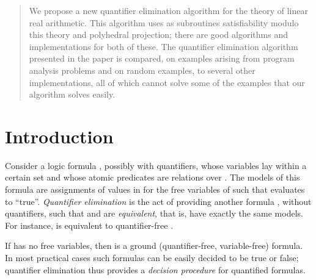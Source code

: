 \newcommand{\bbQ}{\mathbb{Q}}
\newcommand{\bbR}{\mathbb{R}}
\newcommand{\parts}[1]{\mathcal{P}(#1)}
\newcommand{\sem}[1]{\llbracket #1 \rrbracket}

\newcommand{\eabs}{\epsilon_{\text{abs}}}
\newcommand{\erel}{\epsilon_{\text{rel}}}

\newcommand{\lfp}{\text{lfp~}}

\newcommand{\abstr}[1]{#1^\sharp}

\newcommand{\definedAs}{\stackrel{\text{def}}{=}}

\renewcommand{\topfraction}{1.00}
\renewcommand{\floatpagefraction}{1.00}
\renewcommand{\textfraction}{0.00}
\renewcommand{\dbltopfraction}{1.00}
\renewcommand{\dblfloatpagefraction}{1.00}

\maketitle

\begin{abstract}
We propose a new quantifier elimination algorithm for the theory of linear real arithmetic. This algorithm uses as subroutines satisfiability modulo this theory and polyhedral projection; there are good algorithms and implementations for both of these. The quantifier elimination algorithm presented in the paper is compared, on examples arising from program analysis problems and on random examples, to several other implementations, all of which cannot solve some of the examples that our algorithm solves easily.
\end{abstract}

\sloppy

\section{Introduction}
Consider a logic formula , possibly with quantifiers, whose variables lay within a certain set  and whose atomic predicates are relations over . The models of this formula are assignments of values in  for the free variables of  such that  evaluates to ``true''. \emph{Quantifier elimination} is the act of providing another formula , without quantifiers, such that  and  are \emph{equivalent}, that is, have exactly the same models. For instance,  is equivalent to quantifier-free .

If  has no free variables, then  is a ground (quantifier-free, variable-free) formula. In most practical cases such formulas can be easily decided to be true or false; quantifier elimination thus provides a \emph{decision procedure} for quantified formulas.

